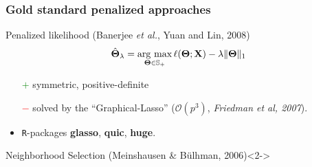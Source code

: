 \begin{frame}
  \frametitle{Gold standard penalized approaches}

  \vspace{-.25cm}
  
  \begin{overlayarea}{\textwidth}{\textheight}

    \begin{block}{Penalized   likelihood  (Banerjee   \textit{et
          al.}, Yuan and Lin, 2008)}
      \vspace{-1em}
      \begin{equation*}
        \hat{\boldsymbol\Theta}_\lambda=\mathop{\mathrm{arg\ max}}_{\boldsymbol\Theta \in \mathbb{S}_+}
        \ell(\boldsymbol\Theta;\mathbf{X})-\lambda
        \|\boldsymbol\Theta\|_{1}
      \end{equation*}
    \end{block}
    \vspace*{-1.5em}
    
    \begin{itemize}
    \item[\textcolor{green}{$+$}] symmetric, positive-definite
    \item[\textcolor{red}{$-$}]       solved      by       the
      ``Graphical-Lasso''                 ($\mathcal{O}(p^3)$,
      \textit{Friedman et al, 2007}).
    \item \texttt{R}-packages \textbf{glasso}, \textbf{quic}, \textbf{huge}.
    \end{itemize}
    
    \vfill
    
    \begin{block}{Neighborhood    Selection   (Meinshausen    \&
        B\"ulhman, 2006)}<2-> \vspace*{-1em}
      \vspace*{-1.5em}
    \end{block}
    

\end{overlayarea}
\end{frame}
